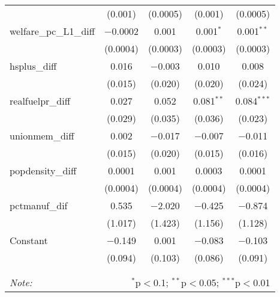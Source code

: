 \begin{table}[!htbp]
\begin{tabular}{@{\extracolsep{5pt}}lcccc}
  & (0.001) & (0.0005) & (0.001) & (0.0005) \\ 
  welfare\_pc\_L1\_diff & $-$0.0002 & 0.001 & 0.001$^{*}$ & 0.001$^{**}$ \\ 
  & (0.0004) & (0.0003) & (0.0003) & (0.0003) \\ 
  hsplus\_diff & 0.016 & $-$0.003 & 0.010 & 0.008 \\ 
  & (0.015) & (0.020) & (0.020) & (0.024) \\ 
  realfuelpr\_diff & 0.027 & 0.052 & 0.081$^{**}$ & 0.084$^{***}$ \\ 
  & (0.029) & (0.035) & (0.036) & (0.023) \\ 
  unionmem\_diff & 0.002 & $-$0.017 & $-$0.007 & $-$0.011 \\ 
  & (0.015) & (0.020) & (0.015) & (0.016) \\ 
  popdensity\_diff & 0.0001 & 0.001 & 0.0003 & 0.0001 \\ 
  & (0.0004) & (0.0004) & (0.0004) & (0.0004) \\ 
  pctmanuf\_dif & 0.535 & $-$2.020 & $-$0.425 & $-$0.874 \\ 
  & (1.017) & (1.423) & (1.156) & (1.128) \\ 
  Constant & $-$0.149 & 0.001 & $-$0.083 & $-$0.103 \\ 
  & (0.094) & (0.103) & (0.086) & (0.091) \\ 
 \hline \\[-1.8ex] 
\hline 
\hline \\[-1.8ex] 
\textit{Note:}  & \multicolumn{4}{r}{$^{*}$p$<$0.1; $^{**}$p$<$0.05; $^{***}$p$<$0.01} \\ 
\end{tabular} 
\end{table} 
